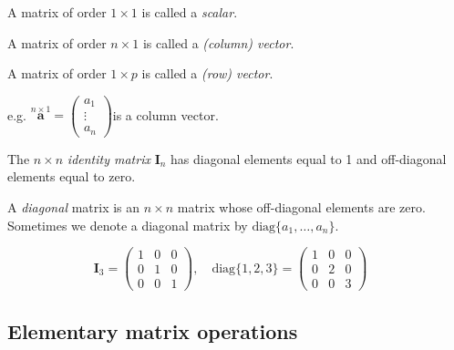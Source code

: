 \documentclass[]{book}
\theoremstyle{definition}
\theoremstyle{definition}
\theoremstyle{definition}
\theoremstyle{remark}
\begin{document}
A matrix of order \(1\times 1\) is called a \emph{scalar}.

A matrix of order \(n\times 1\) is called a \emph{(column) vector}.

A matrix of order \(1\times p\) is called a \emph{(row) vector}.

e.g. \(\stackrel{n\times 1}{\mathbf a}=\left( \begin{array}{c} a_1\\\vdots\\a_n \end{array} \right)\)\quad is a column vector.

The \(n\times n\) \emph{identity matrix} \({\mathbf I}_n\) has diagonal elements equal to 1
and off-diagonal elements equal to zero.

A \emph{diagonal} matrix is an \(n \times n\) matrix whose
off-diagonal elements are zero. Sometimes we denote a diagonal
matrix by \(\text{diag}\{a_1,\ldots, a_n\}\).

\[\mathbf I_3 = \left(\begin{array}{ccc} 1&0&0\\ 0&1&0\\ 0&0&1\end{array}\right),\quad \text{diag}\{1,2,3\}=\left(\begin{array}{ccc} 1&0&0\\ 0&2&0\\ 0&0&3\end{array}\right)\quad\]

\hypertarget{elementary-matrix-operations}{%
\subsection{Elementary matrix operations}\label{elementary-matrix-operations}}
\end{document}
